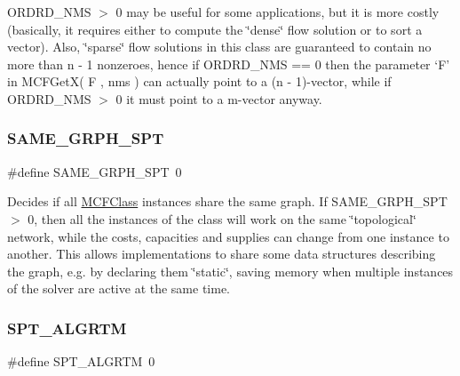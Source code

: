 O\+R\+D\+R\+D\+\_\+\+N\+MS $>$ 0 may be useful for some applications, but it is more costly (basically, it requires either to compute the \char`\"{}dense\char`\"{} flow solution or to sort a vector). Also, \char`\"{}sparse\char`\"{} flow solutions in this class are guaranteed to contain no more than n -\/ 1 nonzeroes, hence if O\+R\+D\+R\+D\+\_\+\+N\+MS == 0 then the parameter `F' in M\+C\+F\+Get\+X( F , nms ) can actually point to a (n -\/ 1)-\/vector, while if O\+R\+D\+R\+D\+\_\+\+N\+MS $>$ 0 it must point to a m-\/vector anyway. \mbox{\label{group___s_p_t_r_e_e___m_a_c_r_o_s_gac2e46738206e9f275b6249a6ef284595}} 
\subsubsection{\texorpdfstring{S\+A\+M\+E\+\_\+\+G\+R\+P\+H\+\_\+\+S\+PT}{SAME\_GRPH\_SPT}}
{\footnotesize\ttfamily \#define S\+A\+M\+E\+\_\+\+G\+R\+P\+H\+\_\+\+S\+PT~0}

Decides if all \mbox{\hyperlink{class_m_c_f_class}{M\+C\+F\+Class}} instances share the same graph. If S\+A\+M\+E\+\_\+\+G\+R\+P\+H\+\_\+\+S\+PT $>$ 0, then all the instances of the class will work on the same \char`\"{}topological\char`\"{} network, while the costs, capacities and supplies can change from one instance to another. This allows implementations to share some data structures describing the graph, e.\+g. by declaring them \char`\"{}static\char`\"{}, saving memory when multiple instances of the solver are active at the same time. \mbox{\label{group___s_p_t_r_e_e___m_a_c_r_o_s_gace32589e54f63e7934ba934f5893af4b}} 
\subsubsection{\texorpdfstring{S\+P\+T\+\_\+\+A\+L\+G\+R\+TM}{SPT\_ALGRTM}}
{\footnotesize\ttfamily \#define S\+P\+T\+\_\+\+A\+L\+G\+R\+TM~0}


